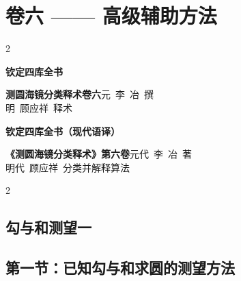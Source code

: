 \documentclass[11pt,a4paper]{article}
\begin{document}
\section*{\textcolor{volumecolor}{卷六} —— 高级辅助方法}

\begin{paracol}{2}

\switchcolumn*
\begin{center}
\noindent\textbf{钦定四库全书}

\vspace{0.5em}
\noindent\textbf{测圆海镜分类释术卷六}\quad 元~李~冶~撰\\
明~顾应祥~释术
\end{center}

\switchcolumn
\begin{center}
\noindent\textbf{钦定四库全书（现代语译）}

\vspace{0.5em}
\noindent\textbf{《测圆海镜分类释术》第六卷}\quad 元代~李~冶~著\\
明代~顾应祥~分类并解释算法
\end{center}

\end{paracol}

\vspace{1em}

\begin{paracol}{2}

\subsection*{\textcolor{sectioncolor}{勾与和测望一}}
\switchcolumn
\subsection*{\textcolor{sectioncolor}{第一节：已知勾与和求圆的测望方法}}

\end{paracol}

\vspace{0.5em}
\end{document}
